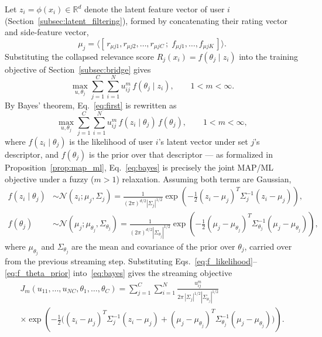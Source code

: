 \documentclass{article}
\theoremstyle{plain}
\theoremstyle{definition}
\theoremstyle{remark}
\begin{document}
Let $z_i = \phi(x_i) \in \mathbb{R}^d$ denote the latent feature vector of user $i$ (Section~\ref{subsec:latent_filtering}), formed by concatenating their rating vector and side-feature vector,
\[
\mu_j = \big\langle [\,r_{\mu j1}, r_{\mu j2}, \ldots, r_{\mu jC}\,;\; f_{\mu j1}, \ldots, f_{\mu jK}\,] \big\rangle .
\]
Substituting the collapsed relevance score $R_j(x_i) = f(\theta_j \mid z_i)$ into the training objective of Section~\ref{subsec:bridge} gives
\begin{equation}
	\label{eq:first}
	\max_{u,\theta_j} \sum_{j=1}^{C} \sum_{i=1}^{N} u_{ij}^m \, f(\theta_j \mid z_i), \qquad 1 < m < \infty.
\end{equation}
By Bayes' theorem, Eq.~\eqref{eq:first} is rewritten as
\begin{equation}
	\label{eq:bayes}
	\max_{u,\theta_j} \sum_{j=1}^{C} \sum_{i=1}^{N} u_{ij}^m \, f(z_i \mid \theta_j) \, f(\theta_j), \qquad 1 < m < \infty,
\end{equation}
where $f(z_i \mid \theta_j)$ is the likelihood of user $i$'s latent vector under set $j$'s descriptor, and $f(\theta_j)$ is the prior over that descriptor — as formalized in Proposition~\ref{prop:map_ml}, Eq.~\eqref{eq:bayes} is precisely the joint MAP/ML objective under a fuzzy ($m>1$) relaxation. Assuming both terms are Gaussian,
\begin{align}
	f(z_i \mid \theta_j) &\sim \mathcal{N}(z_i; \mu_j, \Sigma_j) = \frac{1}{(2\pi)^{d/2} |\Sigma_j|^{1/2}} \exp\!\left( -\frac{1}{2} (z_i - \mu_j)^T \Sigma_j^{-1} (z_i - \mu_j) \right), \label{eq:f_likelihood} \\
	f(\theta_j) &\sim \mathcal{N}(\mu_j; \mu_{\theta_j}, \Sigma_{\theta_j}) = \frac{1}{(2\pi)^{d/2} |\Sigma_{\theta_j}|^{1/2}} \exp\!\left( -\frac{1}{2} (\mu_j - \mu_{\theta_j})^T \Sigma_{\theta_j}^{-1} (\mu_j - \mu_{\theta_j}) \right), \label{eq:f_theta_prior}
\end{align}
where $\mu_{\theta_j}$ and $\Sigma_{\theta_j}$ are the mean and covariance of the prior over $\theta_j$, carried over from the previous streaming step. Substituting Eqs.~\eqref{eq:f_likelihood}--\eqref{eq:f_theta_prior} into~\eqref{eq:bayes} gives the streaming objective
\begin{equation}
	\label{eq:obj_function}
	\begin{split}
		J_m(u_{11}, \ldots, u_{NC}, \theta_1, \ldots, \theta_C) = \sum_{j=1}^{C} \sum_{i=1}^{N} \frac{u_{ij}^m}{2\pi \, |\Sigma_j|^{1/2} |\Sigma_{\theta_j}|^{1/2}} \\
		\times \exp\!\left( -\frac{1}{2} \Big( (z_i - \mu_j)^T \Sigma_j^{-1} (z_i - \mu_j) + (\mu_j - \mu_{\theta_j})^T \Sigma_{\theta_j}^{-1} (\mu_j - \mu_{\theta_j}) \Big) \right).
	\end{split}
\end{equation}
\end{document}
